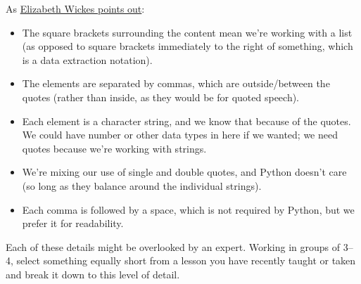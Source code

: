As \href{https://twitter.com/elliewix/status/981285432922202113}{Elizabeth Wickes points out}:

\begin{itemize}
\item
  The square brackets surrounding the content mean we're working with
  a list (as opposed to square brackets immediately to the right of
  something, which is a data extraction notation).
\item
  The elements are separated by commas, which are outside/between the
  quotes (rather than inside, as they would be for quoted speech).
\item
  Each element is a character string, and we know that because of the
  quotes. We could have number or other data types in here if we
  wanted; we need quotes because we're working with strings.
\item
  We're mixing our use of single and double quotes, and Python doesn't
  care (so long as they balance around the individual strings).
\item
  Each comma is followed by a space, which is not required by Python,
  but we prefer it for readability.
\end{itemize}

Each of these details might be overlooked by an expert. Working in
groups of 3--4, select something equally short from a lesson you have
recently taught or taken and break it down to this level of detail.

